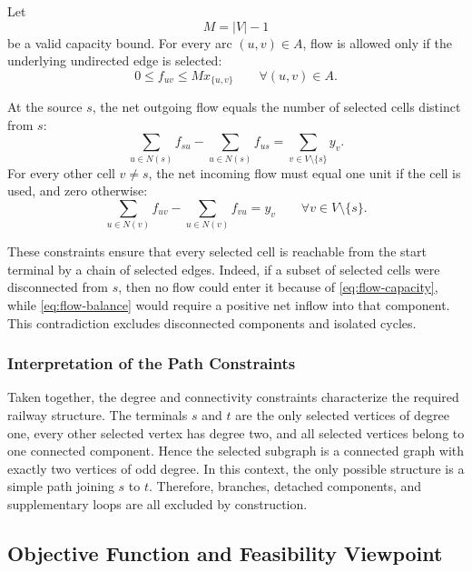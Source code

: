 Let
\[
    M = |V|-1
\]
be a valid capacity bound. For every arc \((u,v) \in A\), flow is allowed only if the underlying undirected edge is selected:
\begin{equation}
    0 \leq f_{uv} \leq M x_{\{u,v\}}
    \qquad \forall (u,v) \in A.
    \label{eq:flow-capacity}
\end{equation}

At the source \(s\), the net outgoing flow equals the number of selected cells distinct from \(s\):
\begin{equation}
    \sum_{u \in N(s)} f_{su}
    -
    \sum_{u \in N(s)} f_{us}
    =
    \sum_{v \in V \setminus \{s\}} y_v.
    \label{eq:flow-source}
\end{equation}
For every other cell \(v \neq s\), the net incoming flow must equal one unit if the cell is used, and zero otherwise:
\begin{equation}
    \sum_{u \in N(v)} f_{uv}
    -
    \sum_{u \in N(v)} f_{vu}
    =
    y_v
    \qquad \forall v \in V \setminus \{s\}.
    \label{eq:flow-balance}
\end{equation}

These constraints ensure that every selected cell is reachable from the start terminal by a chain of selected edges. Indeed, if a subset of selected cells were disconnected from \(s\), then no flow could enter it because of \eqref{eq:flow-capacity}, while \eqref{eq:flow-balance} would require a positive net inflow into that component. This contradiction excludes disconnected components and isolated cycles.

\subsubsection{Interpretation of the Path Constraints}

Taken together, the degree and connectivity constraints characterize the required railway structure. The terminals \(s\) and \(t\) are the only selected vertices of degree one, every other selected vertex has degree two, and all selected vertices belong to one connected component. Hence the selected subgraph is a connected graph with exactly two vertices of odd degree. In this context, the only possible structure is a simple path joining \(s\) to \(t\). Therefore, branches, detached components, and supplementary loops are all excluded by construction.

\subsection{Objective Function and Feasibility Viewpoint}

